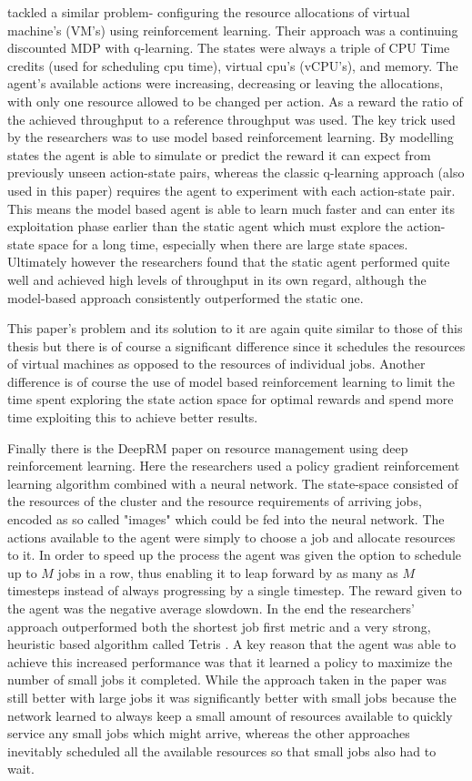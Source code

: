 \cite{vconf} tackled a similar problem- configuring the resource allocations of virtual machine's (VM's) using reinforcement learning. Their approach was a continuing discounted MDP with q-learning. The states were always a triple of CPU Time credits (used for scheduling cpu time), virtual cpu's (vCPU's), and memory. The agent's available actions were increasing, decreasing or leaving the allocations, with only one resource allowed to be changed per action. As a reward the ratio of the achieved throughput to a reference throughput was used. The key trick used by the researchers was to use model based reinforcement learning. By modelling states the agent is able to simulate or predict the reward it can expect from previously unseen action-state pairs, whereas the classic q-learning approach (also used in this paper) requires the agent to experiment with each action-state pair. This means the model based agent is able to learn much faster and can enter its exploitation phase earlier than the static agent which must explore the action-state space for a long time, especially when there are large state spaces. Ultimately however the researchers found that the static agent performed quite well and achieved high levels of throughput in its own regard, although the model-based approach consistently outperformed the static one. 

This paper's problem and its solution to it are again quite similar to those of this thesis but there is of course a significant difference since it schedules the resources of virtual machines as opposed to the resources of individual jobs. Another difference is of course the use of model based reinforcement learning to limit the time spent exploring the state action space for optimal rewards and spend more time exploiting this to achieve better results. 

Finally there is the DeepRM \cite{DeepRM} paper on resource management using deep reinforcement learning. Here the researchers used a policy gradient reinforcement learning algorithm combined with a neural network. The state-space consisted of the resources of the cluster and the resource requirements of arriving jobs, encoded as so called "images" which could be fed into the neural network. The actions available to the agent were simply to choose a job and allocate resources to it. In order to speed up the process the agent was given the option to schedule up to $M$ jobs in a row, thus enabling it to leap forward by as many as $M$ timesteps instead of always progressing by a single timestep. The reward given to the agent was the negative average slowdown. In the end the researchers' approach outperformed both the shortest job first metric and a very strong, heuristic based algorithm called Tetris \cite{tetris}. A key reason that the agent was able to achieve this increased performance was that it learned a policy to maximize the number of small jobs it completed. While the approach taken in the paper was still better with large jobs it was significantly better with small jobs because the network learned to always keep a small amount of resources available to quickly service any small jobs which might arrive, whereas the other approaches inevitably scheduled all the available resources so that small jobs also had to wait.

